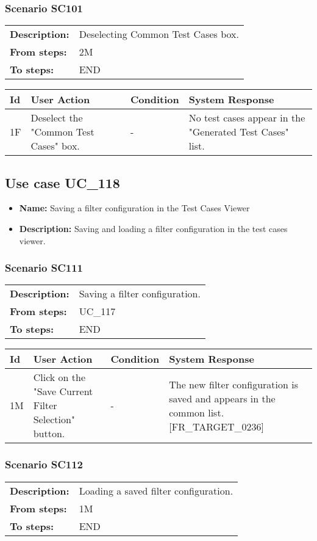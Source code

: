 \documentclass[a4paper,11pt]{article}
\newcommand{\bl}{\\ \hline}
\begin{document}
\subsubsection*{Scenario SC101}
\begin{tabular}{p{1in}p{4in}}
{\bf Description:} & Deselecting Common Test Cases box. \\
{\bf From steps:} & 2M \\
{\bf To steps:} & END \\
\end{tabular}
 
\begin{tabular}{|p{0.8in}|p{1.6in}|p{1.6in}|p{1.6in}|}
\hline
Id & User Action & Condition & System Response  \bl 
1F & Deselect the "Common Test Cases" box. & - & No test cases appear in the "Generated Test Cases" list.
					 \bl 
\end{tabular}
\subsection*{Use case UC_118}
\begin{itemize}
\item {\bf Name: }Saving a filter configuration in the Test Cases Viewer
\item {\bf Description: }Saving and loading a filter configuration in the test
				cases viewer.
\end{itemize}
\subsubsection*{Scenario SC111}
\begin{tabular}{p{1in}p{4in}}
{\bf Description:} & Saving a filter configuration. \\
{\bf From steps:} & UC_117#2A \\
{\bf To steps:} & END \\
\end{tabular}
 
\begin{tabular}{|p{0.8in}|p{1.6in}|p{1.6in}|p{1.6in}|}
\hline
Id & User Action & Condition & System Response  \bl 
1M & Click on the "Save Current Filter Selection" button.
					 & - & The new filter configuration is saved and appears in the
						common list. [FR_TARGET_0236] \bl 
\end{tabular}
\subsubsection*{Scenario SC112}
\begin{tabular}{p{1in}p{4in}}
{\bf Description:} & Loading a saved filter configuration. \\
{\bf From steps:} & 1M \\
{\bf To steps:} & END \\
\end{tabular}
 
\end{document}
